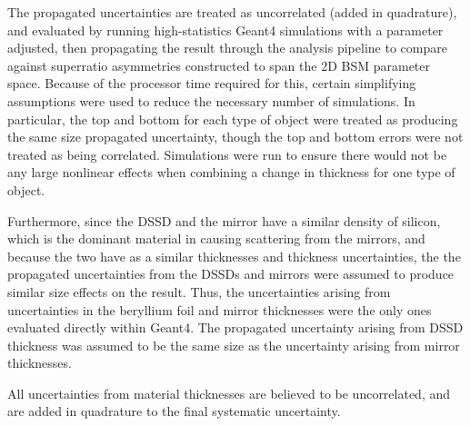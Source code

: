 The propagated uncertainties are treated as uncorrelated (added in quadrature), and evaluated by running high-statistics Geant4 simulations with a parameter adjusted, then propagating the result through the analysis pipeline to compare against superratio asymmetries constructed to span the 2D BSM parameter space.  Because of the processor time required for this, certain simplifying assumptions were used to reduce the necessary number of simulations.  In particular, the top and bottom for each type of object were treated as producing the same size propagated uncertainty, though the top and bottom errors were not treated as being correlated.  Simulations were run to ensure there would not be any large nonlinear effects when combining a change in thickness for one type of object.  

Furthermore, since the DSSD and the mirror have a similar density of silicon, which is the dominant material in causing scattering from the mirrors, and because the two have as a similar thicknesses and thickness uncertainties, the the propagated uncertainties from the DSSDs and mirrors were assumed to produce similar size effects on the result.  Thus, the uncertainties arising from uncertainties in the beryllium foil and mirror thicknesses were the only ones evaluated directly within Geant4.  The propagated uncertainty arising from DSSD thickness was assumed to be the same size as the uncertainty arising from mirror thicknesses.  

All uncertainties from material thicknesses are believed to be uncorrelated, and are added in quadrature to the final systematic uncertainty.  


 


%

